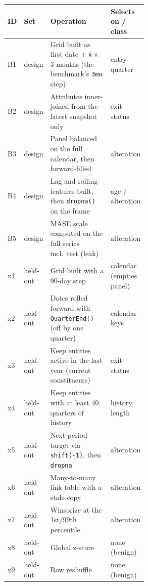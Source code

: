 \begin{tabular}{llp{0.55\linewidth}l}
\toprule
ID & Set & Operation & Selects on / class \\
\midrule
B1 & design & Grid built as first date + $k\times$3 months (the benchmark's \texttt{3mo} step) & entry quarter \\
B2 & design & Attributes inner-joined from the latest snapshot only & exit status \\
B3 & design & Panel balanced on the full calendar, then forward-filled & alteration \\
B4 & design & Lag and rolling features built, then \texttt{dropna()} on the frame & age / alteration \\
B5 & design & MASE scale computed on the full series incl.\ test (leak) & alteration \\
x1 & held-out & Grid built with a 90-day step & calendar (empties panel) \\
x2 & held-out & Dates rolled forward with \texttt{QuarterEnd()} (off by one quarter) & calendar keys \\
x3 & held-out & Keep entities active in the last year (current constituents) & exit status \\
x4 & held-out & Keep entities with at least 40 quarters of history & history length \\
x5 & held-out & Next-period target via \texttt{shift(-1)}, then \texttt{dropna} & alteration \\
x6 & held-out & Many-to-many link table with a stale copy & alteration \\
x7 & held-out & Winsorize at the 1st/99th percentile & alteration \\
x8 & held-out & Global z-score & none (benign) \\
x9 & held-out & Row reshuffle & none (benign) \\
\bottomrule
\end{tabular}
